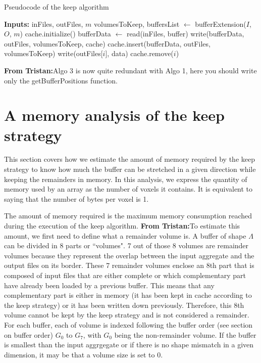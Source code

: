 \documentclass[conference]{IEEEtran}
\newcommand{\tristan}[1]{\color{orange}\textbf{From Tristan:}#1\color{black}}
\begin{document}
\begin{algorithm}
  \caption{Pseudocode of the keep algorithm}
  \label{algo:keepalgorithm}
  \begin{algorithmic}[1]
    \STATE \textbf{Inputs:} inFiles, outFiles, $m$
    \STATE volumesToKeep, buffersList $\leftarrow$ bufferExtension($I$, $O$, $m$)
    \STATE cache.initialize()
      \STATE bufferData $\leftarrow$ read(inFiles, buffer)
      \STATE write(bufferData, outFiles, volumesToKeep, cache)
      \STATE cache.insert(bufferData, outFiles, volumesToKeep)
          \STATE write(outFiles[$i$], data)
          \STATE cache.remove($i$)
        \ENDIF
      \ENDFOR
    \ENDFOR

  \end{algorithmic}
\end{algorithm}

\tristan{Algo 3 is now quite redundant with Algo 1, here you should write only the getBufferPositions function.}

\section{A memory analysis of the keep strategy}
This section covers how we estimate the amount of memory required by the keep
strategy to know how much the buffer can be stretched in a given direction while
keeping the remainders in memory. In this analysis, we express the quantity of
memory used by an array as the number of voxels it contains. It is equivalent
to saying that the number of bytes per voxel is 1.

The amount of memory required is the maximum memory consumption reached during
the execution of the keep algorithm. \tristan{To estimate this amount, we first need to
define what a remainder volume is}. A buffer of shape $\Lambda$ can be divided in
8 parts or ``volumes". 7 out of those 8 volumes are remainder volumes because
they represent the overlap between the input aggregate and the output files on
its border. These 7 remainder volumes enclose an 8th part that is composed of
input files that are either complete or which complementary part have already
been loaded by a previous buffer. This means that any complementary part is either
in memory (it has been kept in cache according to the keep strategy) or it has
been written down previously. Therefore, this 8th volume cannot be kept by the
keep strategy and is not considered a remainder. For each buffer, each of volume
is indexed following the buffer order (see section on buffer order) $G_0$ to $G_7$, with
$G_0$ being the non-remainder volume. If the buffer is smallest than the input
aggrgegate or if there is no shape mismatch in a given dimension, it may be that
a volume size is set to 0.
\end{document}
